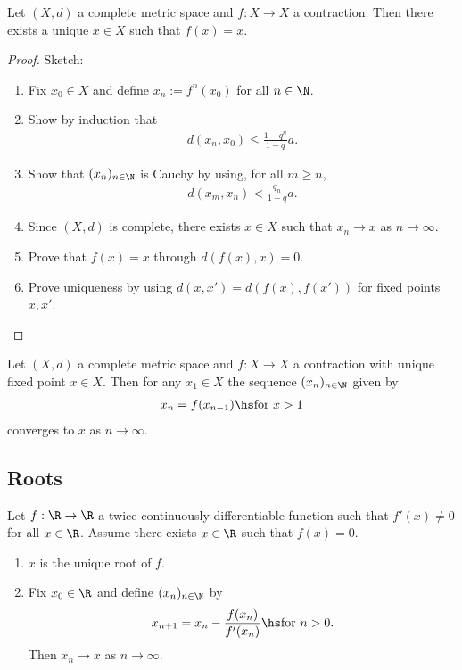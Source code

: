 \documentclass{article}
\begin{document}
\begin{theorem}
	Let $(X,d)$ a complete metric space and $f:X\to X$ a contraction. Then there exists a
	unique $x\in X$ such that $f(x)=x$.
	\begin{proof}
		Sketch:
		\begin{enumerate}
			\item Fix $x_0\in X$ and define $x_n:= f^n(x_0)$ for all $n\in\N$.
			\item Show by induction that \begin{align*}
				d(x_n,x_0)\leq \frac{1-q^n}{1-q}a.
			\end{align*}
			\item Show that $(x_n)_{n\in\N}$ is Cauchy by using, for all $m\geq n$, \begin{align*}
				d(x_m,x_n)<\frac{q_n}{1-q}a.
			\end{align*}
			\item Since $(X,d)$ is complete, there exists $x\in X$ such that $x_n\to x$ as $n\to\infty$.
			\item Prove that $f(x)=x$ through $d(f(x),x)=0$.
			\item Prove uniqueness by using $d(x,x')=d(f(x),f(x'))$ for fixed points $x,x'$.
		\end{enumerate}
	\end{proof}
\end{theorem}

\begin{theorem}
	Let $(X,d)$ a complete metric space and $f:X\to X$ a contraction with unique fixed
	point $x\in X$. Then for any $x_1\in X$ the sequence $(x_n)_{n\in\N}$ given by 
	\begin{align*}
		x_n = f(x_{n-1}) \hs\text{for $x>1$}
	\end{align*}
	converges to $x$ as $n\to\infty$.
\end{theorem}

\subsection{Roots}

\begin{proposition}
	Let $f:\R\to\R$ a twice continuously differentiable function such that $f'(x)\neq 0$
	for all $x\in\R$. Assume there exists $x\in\R$ such that $f(x)=0$. 
	\begin{enumerate}
		\item $x$ is the unique root of $f$.
  		\item Fix $x_0\in\R$ and define $(x_n)_{n\in\N}$ by \begin{align*}
			x_{n+1} = x_n - \frac{f(x_n)}{f'(x_n)} \hs\text{for $n>0$}.
		\end{align*}
		Then $x_n\to x$ as $n\to\infty$.
	\end{enumerate}

\end{proposition}
\end{document}
